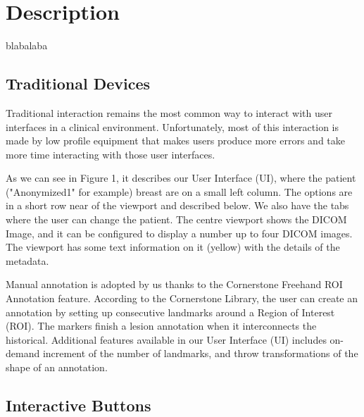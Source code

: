 \section{Description}

blabalaba

\subsection{Traditional Devices}

Traditional interaction remains the most common way to interact with user interfaces in a clinical environment. Unfortunately, most of this interaction is made by low profile equipment that makes users produce more errors and take more time interacting with those user interfaces.


As we can see in Figure 1, it describes our User Interface (UI), where the patient ("Anonymized1" for example) breast are on a small left column. The options are in a short row near of the viewport and described below. We also have the tabs where the user can change the patient. The centre viewport shows the DICOM Image, and it can be configured to display a number up to four DICOM images. The viewport has some text information on it (yellow) with the details of the metadata.

Manual annotation is adopted by us thanks to the Cornerstone Freehand ROI Annotation feature. According to the Cornerstone Library, the user can create an annotation by setting up consecutive landmarks around a Region of Interest (ROI). The markers finish a lesion annotation when it interconnects the historical. Additional features available in our User Interface (UI) includes on-demand increment of the number of landmarks, and throw transformations of the shape of an annotation.

\subsection{Interactive Buttons}


